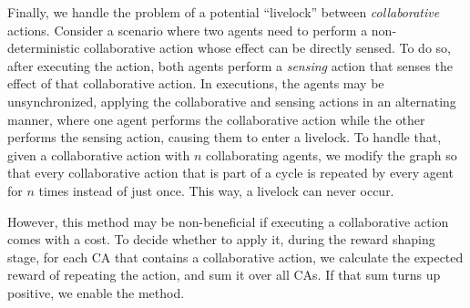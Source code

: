 \documentclass[letterpaper]{article}
\theoremstyle{definition}
\begin{document}
Finally, we handle the problem of a potential ``livelock'' between \emph{collaborative} actions. Consider a scenario where two agents need to perform a non-deterministic collaborative action whose effect can be directly sensed. To do so, after executing the action, both agents perform a \emph{sensing} action that senses the effect of that collaborative action.
In executions, the agents may be unsynchronized,  applying the collaborative and sensing actions in an alternating manner, where one agent performs the collaborative action while the other performs the sensing action, causing them to enter a livelock. To handle that, given a collaborative action with $n$ collaborating agents, we modify the graph so that every collaborative action that is part of a cycle is repeated by every agent for $n$ times instead of just once. This way, a livelock can never occur. 

However, this method may be non-beneficial if
executing a collaborative action comes with a cost.
To decide whether to apply it, during the reward shaping stage, for each CA that contains a collaborative action, we calculate the expected reward of repeating the action, and sum it over all CAs. If that sum turns up positive, we enable the method.
\end{document}

